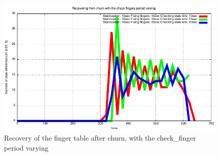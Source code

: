 \message{ !name(LSDS_project2_hayezl.tex)}\documentclass[a4paper, 11pt]{article}
\theoremstyle{plain}
\theoremstyle{definition}
\begin{document}
    
    \begin{figure}[h]
      \centering
      \includegraphics{plots/Recovery-SR-check-fingers.pdf}
      \caption{Recovery of the finger table after churn, with the check\_finger period varying}
      \label{fig:Rec-SR-check-finger}
    \end{figure}



    
    
    












	
\end{document}
